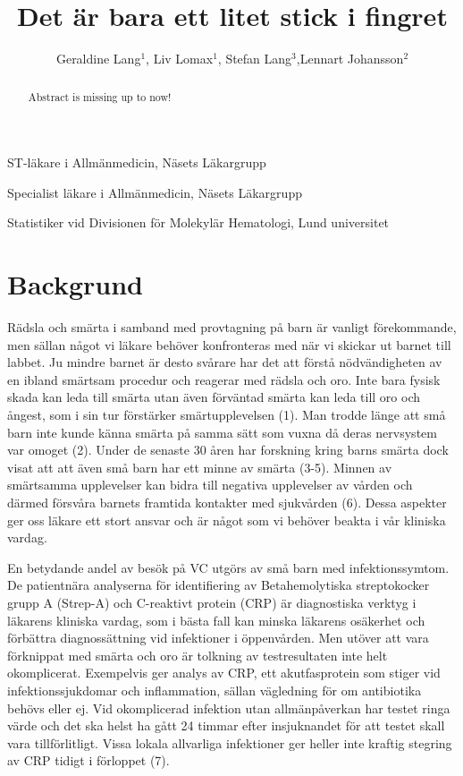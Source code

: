 \documentclass{nature}
\title{Det \"ar bara ett litet stick i fingret}
\author{Geraldine Lang$^{1}$, Liv Lomax$^1$, Stefan Lang$^3$,Lennart
Johansson$^2$}
\begin{document}
\maketitle

\begin{affiliations}
 \item ST-l\"akare i Allm\"anmedicin, N\"asets L\"akargrupp
 \item Specialist l\"akare i Allm\"anmedicin, N\"asets L\"akargrupp
 \item Statistiker vid Divisionen f\"or Molekyl\"ar Hematologi, Lund universitet
\end{affiliations}

\begin{abstract}
Abstract is missing up to now!
\end{abstract}


\section{Backgrund}

R\"adsla och sm\"arta i samband med provtagning p\r{a} barn \"ar vanligt f\"orekommande, men
s\"allan n\r{a}got vi l\"akare beh\"over konfronteras med n\"ar vi skickar ut barnet till
labbet. Ju mindre barnet \"ar desto sv\r{a}rare har det att f\"orst\r{a} n\"odv\"andigheten av
en ibland sm\"artsam procedur och reagerar med r\"adsla och oro. Inte bara fysisk
skada kan leda till sm\"arta utan \"aven f\"orv\"antad sm\"arta kan leda till oro och
\r{a}ngest, som i sin tur f\"orst\"arker sm\"artupplevelsen (1). Man trodde l\"ange att sm\r{a}
barn inte kunde k\"anna sm\"arta p\r{a} samma s\"att som vuxna d\r{a} deras nervsystem var
omoget (2). Under de senaste 30 \r{a}ren har forskning kring barns sm\"arta dock visat
att att \"aven sm\r{a} barn har ett minne av sm\"arta (3-5). Minnen av sm\"artsamma
upplevelser kan bidra till negativa upplevelser av v\r{a}rden och d\"armed f\"orsv\r{a}ra
barnets framtida kontakter med sjukv\r{a}rden (6). Dessa aspekter ger oss l\"akare ett
stort ansvar och \"ar n\r{a}got som vi beh\"over beakta i v\r{a}r kliniska vardag.

En betydande andel av bes\"ok p\r{a} VC utg\"ors av sm\r{a} barn med infektionssymtom. De
patientn\"ara analyserna f\"or identifiering av Betahemolytiska streptokocker grupp
A (Strep-A) och C-reaktivt protein (CRP) \"ar diagnostiska verktyg i l\"akarens
kliniska vardag, som i b\"asta fall kan minska l\"akarens os\"akerhet och f\"orb\"attra
diagnoss\"attning vid infektioner i \"oppenv\r{a}rden. Men ut\"over att vara f\"orknippat
med sm\"arta och oro \"ar tolkning av testresultaten inte helt okomplicerat.
Exempelvis ger analys av CRP, ett akutfasprotein som stiger vid
infektionssjukdomar och inflammation, s\"allan v\"agledning f\"or om antibiotika
beh\"ovs eller ej. Vid okomplicerad infektion utan allm\"anp\r{a}verkan har testet ringa
v\"arde och det ska helst ha g\r{a}tt 24 timmar efter insjuknandet f\"or att testet
skall vara tillf\"orlitligt. Vissa lokala allvarliga infektioner ger heller inte
kraftig stegring av CRP tidigt i f\"orloppet (7).
\end{document}

